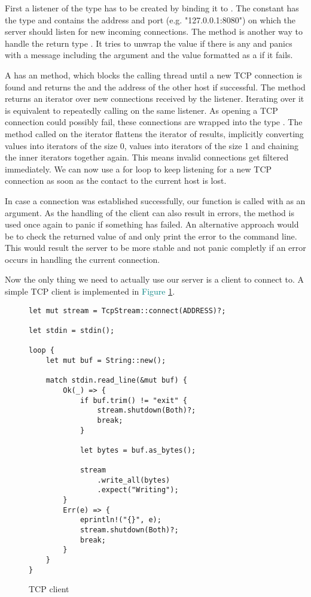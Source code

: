 First a listener of the type  has to be created by binding it to . The
constant  has the type  and contains the address and port (e.g. "127.0.0.1:8080") on which the
server should listen for new incoming connections. The method  is another way to handle the return type
. It tries to unwrap the  value if there is any and panics with a message including the argument
and the  value formatted as a  if it fails.

A  has an  method, which blocks the calling thread until a new TCP connection is found
and returns the  and the address of the other host if successful. The method  returns an
iterator over new connections received by the listener. Iterating over it is equivalent to repeatedly calling
 on the same listener. As opening a TCP connection could possibly fail, these connections are wrapped into
the type . The method  called on the iterator flattens the iterator of results, implicitly
converting  values into iterators of the size 0,  values into iterators of the size 1 and chaining
the inner iterators together again. This means invalid connections get filtered immediately. We can now use a for loop
to keep listening for a new TCP connection as soon as the contact to the current host is lost.

In case a connection was established successfully, our function  is called with  as an
argument. As the handling of the client can also result in errors, the  method is used once again to
panic if something has failed. An alternative approach would be to check the returned value of  and
only print the error to the command line. This would result the server to be more stable and not panic completly if an
error occurs in handling the current connection.

Now the only thing we need to actually use our server is a client to connect to. A simple TCP client is implemented in
\textcolor{teal}{Figure \ref{tcp-client}}.

\begin{figure}[ht]
    \begin{verbatim}
let mut stream = TcpStream::connect(ADDRESS)?;

let stdin = stdin();

loop {
    let mut buf = String::new();

    match stdin.read_line(&mut buf) {
        Ok(_) => {
            if buf.trim() != "exit" {
                stream.shutdown(Both)?;
                break;
            }

            let bytes = buf.as_bytes();

            stream
                .write_all(bytes)
                .expect("Writing");
        }
        Err(e) => {
            eprintln!("{}", e);
            stream.shutdown(Both)?;
            break;
        }
    }
}
    \end{verbatim}
    \caption{TCP client}
    \label{tcp-client}
\end{figure}

